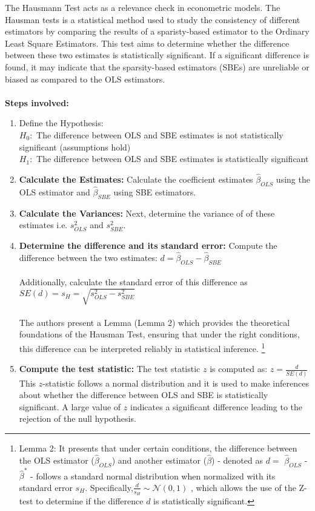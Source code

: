 The Hausmann Test acts as a relevance check in econometric models. The Hausman tests is a statistical method used to study the consistency of different estimators by comparing the results of a sparisty-based estimator to the Ordinary Least Square Estimators. This test aims to determine whether the difference between these two estimates is statistically significant. If a significant difference is found, it may indicate that the sparsity-based estimators (SBEs) are unreliable or biased as compared to the OLS estimators. \\
\\
\textbf{Steps involved:}
\begin{enumerate}
    \item Define the Hypothesis:\\
    $H_0:$ The difference between OLS and SBE estimates is not statistically significant (assumptions hold)\\
    $H_1:$ The difference between OLS and SBE estimates is statistically significant
    \item \textbf{Calculate the Estimates:} Calculate the coefficient estimates $\hat{\beta}_{OLS}$ using the OLS estimator and $\hat{\beta}_{SBE}$ using SBE estimators.
    \item \textbf{Calculate the Variances:} Next, determine the variance of of these estimates i.e. $ s^2_{OLS} $ and $ s^2_{SBE} $.
    \item \textbf{Determine the difference and its standard error:} Compute the difference between the two estimates: $d = \hat{\beta}_{OLS} - \hat{\beta}_{SBE}$\\
    \\
    Additionally, calculate the standard error of this difference as $SE(d) = s_H = \sqrt{s^2_{OLS} - s^2_{SBE}}$\\
    \\
    The authors present a Lemma (Lemma 2) which provides the theoretical foundations of the Hausman Test, ensuring that under the right conditions, this difference can be interpreted reliably in statistical inference. \footnote{Lemma 2: It presents that under certain conditions, the difference between the OLS estimator ($\hat{\beta}_{OLS}$) and another estimator ($\hat{\beta}$) - denoted as $d = $ $\hat{\beta}_{OLS}$ - $\hat{\beta}^*$ - follows a standard normal distribution when normalized with its standard error $s_H$. Specifically,$ \frac{d}{s_H} \sim \mathcal{N}(0,1)$ , which allows the use of the Z-test to determine if the difference $d$ is statistically significant. }
    \item \textbf{Compute the test statistic:} The test statistic $z$ is computed as: 
    $z = \frac{d}{SE(d)}$\\
    This $z$-statistic follows a normal distribution and it is used to make inferences about whether the difference between OLS and SBE is statistically significant. A large value of $z$ indicates a significant difference leading to the rejection of the null hypothesis.
\end{enumerate}

